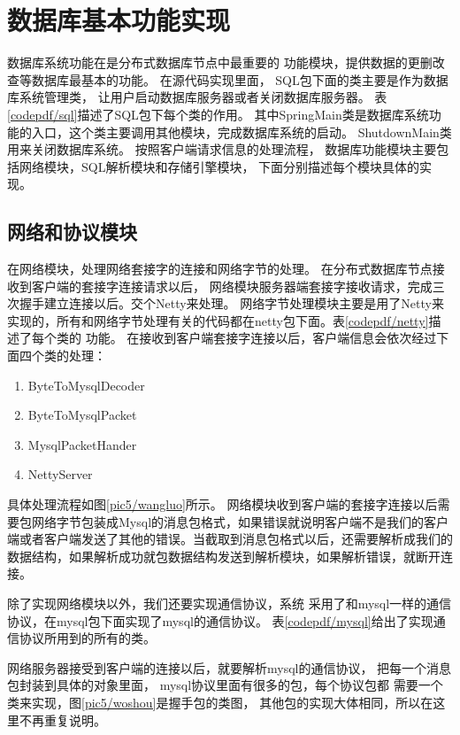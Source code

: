 \section{数据库基本功能实现}
数据库系统功能在是分布式数据库节点中最重要的
功能模块，提供数据的更删改查等数据库最基本的功能。
在源代码实现里面，
SQL包下面的类主要是作为数据库系统管理类，
让用户启动数据库服务器或者关闭数据库服务器。
表\ref{codepdf/sql}描述了SQL包下每个类的作用。
其中SpringMain类是数据库系统功能的入口，这个类主要调用其他模块，完成数据库系统的启动。
ShutdownMain类用来关闭数据库系统。
按照客户端请求信息的处理流程，
数据库功能模块主要包括网络模块，SQL解析模块和存储引擎模块，
下面分别描述每个模块具体的实现。
\subsection{网络和协议模块}
在网络模块，处理网络套接字的连接和网络字节的处理。
在分布式数据库节点接收到客户端的套接字连接请求以后，
网络模块服务器端套接字接收请求，完成三次握手建立连接以后。交个Netty来处理。
网络字节处理模块主要是用了Netty来实现的，所有和网络字节处理有关的代码都在netty包下面。表\ref{codepdf/netty}描述了每个类的
功能。
在接收到客户端套接字连接以后，客户端信息会依次经过下面四个类的处理：
\begin{enumerate}
	\item ByteToMysqlDecoder
	\item ByteToMysqlPacket
	\item MysqlPacketHander
	\item NettyServer
\end{enumerate}
具体处理流程如图\ref{pic5/wangluo}所示。
网络模块收到客户端的套接字连接以后需要包网络字节包装成Mysql的消息包格式，如果错误就说明客户端不是我们的客户端或者客户端发送了其他的错误。当截取到消息包格式以后，还需要解析成我们的数据结构，如果解析成功就包数据结构发送到解析模块，如果解析错误，就断开连接。

除了实现网络模块以外，我们还要实现通信协议，系统
采用了和mysql一样的通信协议，在mysql包下面实现了mysql的通信协议。
表\ref{codepdf/mysql}给出了实现通信协议所用到的所有的类。

网络服务器接受到客户端的连接以后，就要解析mysql的通信协议，
把每一个消息包封装到具体的对象里面，
mysql协议里面有很多的包，每个协议包都
需要一个类来实现，图\ref{pic5/woshou}是握手包的类图，
其他包的实现大体相同，所以在这里不再重复说明。

